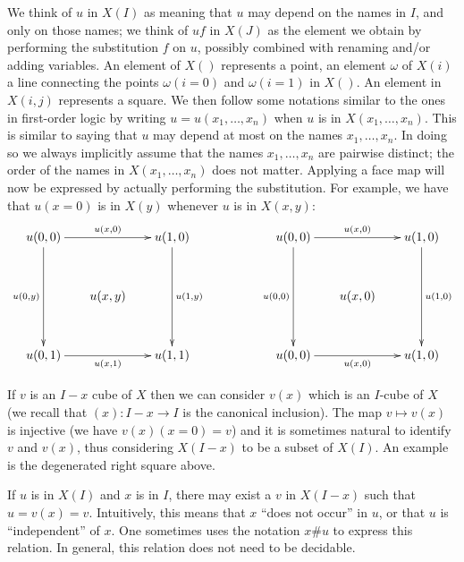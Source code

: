 \documentclass[10pt,a4paper]{article}
\begin{document}
We think of $u$ in $X(I)$ as meaning that $u$ may depend on the names in $I$, and only on those names;
we think of $uf$ in $X(J)$ as the element we obtain by performing the substitution $f$ on $u$,
possibly combined with renaming and/or adding variables.
An element of $X()$ represents a point, an element $\omega$ of $X(i)$ a line connecting the points
$\omega(i=0)$ and $\omega(i=1)$ in $X()$. An element in $X(i,j)$ represents a square.
We then follow some notations similar to the ones in first-order logic by writing $u = u(x_1,\dots,x_n)$ when
$u$ is in $X(x_1,\dots,x_n)$. This is similar to saying that $u$ may depend at most on the names $x_1,\dots,x_n$.
In doing so we always implicitly assume that the names $x_1,\dots,x_n$ are pairwise distinct;
the order of the names in $X(x_1,\dots,x_n)$ does not matter. Applying a face map will now be expressed
by actually performing the substitution. For example, we have that $u(x=0)$ is in $X(y)$ whenever $u$ is in $X(x,y)$:
\[
\xymatrix@R=1.1cm@C=.6cm{
u(0,0)\ar[rr]^{u(x,0)}\ar[dd]_{u(0,y)}&      & u(1,0)\ar[dd]^{u(1,y)}   &&&
u(0,0)\ar[rr]^{u(x,0)}\ar[dd]_{u(0,0)}&      & u(1,0)\ar[dd]^{u(1,0)}       \\
                                      &u(x,y)&                          &&&
                                      &u(x,0)&                              \\
u(0,1)\ar[rr]_{u(x,1)}                &      & u(1,1)                   &&&
u(0,0)\ar[rr]_{u(x,0)}                &      & u(1,0)                       \\
}
\]

If $v$ is an $I-x$ cube of $X$ then we can consider $v(x)$ which is an
$I$-cube of $X$ (we recall that $(x):I-x\to I$ is the canonical
inclusion). The map $v\longmapsto v(x)$ is injective (we have
$v(x)(x=0) = v$) and it is sometimes natural to identify $v$ and
$v(x)$, thus considering $X(I-x)$ to be a subset of $X(I)$. An example
is the degenerated right square above.

 If $u$ is in $X(I)$ and $x$ is in $I$, there may exist a $v$ in $X(I-x)$ such that
$u = v(x) = v$.  Intuitively, this means that $x$ ``does not occur'' in $u$, or that $u$ is
``independent'' of $x$. One sometimes uses the notation $x\#u$ to express this relation. In general, this relation does
not need to be decidable.
\end{document}
